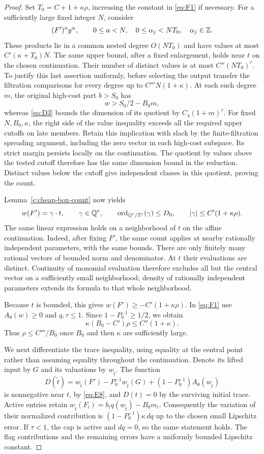 \begin{proof}
Set $T_0=C+1+\kappa\rho$, increasing the constant in
\eqref{eq:F1} if necessary.  For a sufficiently large fixed integer
$N$, consider
\[
          (F')^a y^\alpha,\qquad 0\le a<N,\quad
                          0\le\alpha_j<NT_0,\quad\alpha_j\in\mathbb Z.
\]
These products lie in a common nested degree $O(NT_0)$ and have
values at most $C'(\kappa+T_0)N$.  The same upper bound, after a
fixed enlargement, holds near $t$ on the chosen continuation.
Their number of distinct values is at most $C''(NT_0)^r$.
To justify this last assertion uniformly, before selecting the
output transfer the filtration comparisons for every degree up to
$C'''N(1+\kappa)$.  At each such degree $m$, the original
high-cost part $b>S_0$ has
\[
                    w>S_0/2-B_0m,
\]
whereas \eqref{eq:D3} bounds the dimension of its quotient by
$C_4(1+m)^r$.  For fixed $N,B_0,\kappa$, the right side of the
value inequality exceeds all the required upper cutoffs on late
members.  Retain this implication with slack by the finite-filtration
spreading argument, including the zero vector in each high-cost
subspace.  Its strict margin persists locally on the continuation.
The quotient by values above the tested cutoff therefore has the
same dimension bound in the reduction.  Distinct values below the
cutoff give independent classes in this quotient, proving the count.

Lemma~\ref{c:cheap-box-count} now yields
\[
             w(F')=\gamma\cdot t,\qquad
 \gamma\in\mathbb Q^r,\qquad
 \operatorname{ord}_{\mathbb Q^r/\mathbb Z^r}(\gamma)\le D_0,
 \qquad |\gamma|\le C'(1+\kappa\rho).
\]
The same linear expression holds on a neighborhood of $t$ on the
affine continuation.  Indeed, after fixing $F'$, the same count
applies at nearby rationally independent parameters, with the same
bounds.  There are only finitely many rational vectors of bounded
norm and denominator.  At $t$ their evaluations are distinct.
Continuity of monomial evaluation therefore excludes all but the
central vector on a sufficiently small neighborhood; density of
rationally independent parameters extends its formula to that whole
neighborhood.

Because $t$ is bounded, this gives
$w(F')\ge-C'(1+\kappa\rho)$.  In \eqref{eq:F1} use
$A_\theta(w)\ge0$ and $q,\tau\le1$.  Since $1-P_0^{-1}\ge1/2$,
we obtain
\[
             \kappa(B_0-C')\rho\le C''(1+\kappa).
\]
Thus $\rho\le C'''/B_0$ once $B_0$ and then $\kappa$ are
sufficiently large.

We next differentiate the trace inequality, using equality at the
central point rather than assuming equality throughout the
continuation.  Denote its lifted input by $G$ and its valuations by
$w_{\widetilde t}$.  The function
\[
 D(\widetilde t)=w_{\widetilde t}(F')
       -P_0^{-1}w_{\widetilde t}(G)
       +(1-P_0^{-1})A_\theta(w_{\widetilde t})
\]
is nonnegative near $t$, by \eqref{eq:E8}, and $D(t)=0$ by the
surviving initial trace.  Active entries retain
$w_{\widetilde t}(F_i)=b_iq(w_{\widetilde t})-B_0m_i$.
Consequently the variation of their normalized contribution is
$(1-P_0^{-1})\kappa\,dq$ up to the chosen small Lipschitz error.
If $\tau<1$, the cap is active and $dq=0$, so the same statement
holds.  The flag contributions and the remaining errors have a
uniformly bounded Lipschitz constant.


\end{proof}
